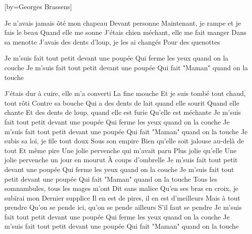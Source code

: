[by={Georges Brassens}]

  \chordsoff

  \beginverse
  Je n'avais jamais ôté mon chapeau
  Devant personne
  Maintenant, je rampe et je fais le beau
  Quand elle me sonne
  J'étais chien méchant, elle me fait manger
  Dans sa menotte
  J'avais des dents d'loup, je les ai changés
  Pour des quenottes
  \endverse

  \beginchorus

  Je m'suis fait tout petit devant une poupée
  Qui ferme les yeux quand on la couche
  Je m'suis fait tout petit devant une poupée
  Qui fait "Maman" quand on la touche
  \endchorus


  \beginverse
  J'étais dur à cuire, elle m'a converti
  La fine mouche
  Et je suis tombé tout chaud, tout rôti
  Contre sa bouche
  Qui a des dents de lait quand elle sourit
  Quand elle chante
  Et des dents de loup, quand elle est furie
  Qu'elle est méchante
  \endverse
  \beginchorus
  Je m'suis fait tout petit devant une poupée
  Qui ferme les yeux quand on la couche
  Je m'suis fait tout petit devant une poupée
  Qui fait "Maman" quand on la touche
  \endchorus
  \beginverse
  Je subis sa loi, je file tout doux
  Sous son empire
  Bien qu'elle soit jalouse au-delà de tout
  Et même pire
  Une jolie pervenche qui m'avait paru
  Plus jolie qu'elle
  Une jolie pervenche un jour en mourut
  À coups d'ombrelle
  \endverse
  \beginchorus
  Je m'suis fait tout petit devant une poupée
  Qui ferme les yeux quand on la couche
  Je m'suis fait tout petit devant une poupée
  Qui fait "Maman" quand on la touche
  \endchorus
  \beginverse
  Tous les somnambules, tous les mages m'ont
  Dit sans malice
  Qu'en ses bras en croix, je subirai mon
  Dernier supplice
  Il en est de pires, il en est d'meilleurs
  Mais à tout prendre
  Qu'on se pende ici, qu'on se pende ailleurs
  S'il faut se pendre
  \endverse
  \beginchorus
  Je m'suis fait tout petit devant une poupée
  Qui ferme les yeux quand on la couche
  Je m'suis fait tout petit devant une poupée
  Qui fait "Maman" quand on la touche
  \endchorus

\endsong
